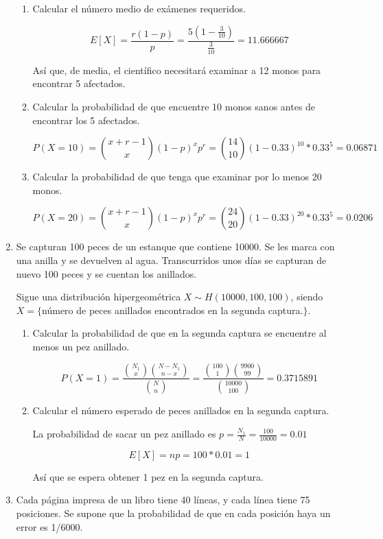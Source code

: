 \documentclass[11pt]{article}
\begin{document}
\begin{enumerate}
\begin{enumerate}
\item Calcular el número medio de exámenes requeridos.

\[
E[X]=\frac{r(1-p)}{p}=\frac{5(1-\frac{3}{10})}{\frac{3}{10}}=11.666667
\]

Así que, de media, el científico necesitará examinar a 12 monos para encontrar 5 afectados.

\item Calcular la probabilidad de que encuentre 10 monos sanos antes de encontrar los 5 afectados.

\[
P(X=10)=\binom{x+r-1}{x}(1-p)^xp^r=\binom{14}{10}(1-0.33)^{10}*0.33^5=0.06871
\]

\item Calcular la probabilidad de que tenga que examinar por lo menos 20 monos.

\[
P(X=20)=\binom{x+r-1}{x}(1-p)^xp^r=\binom{24}{20}(1-0.33)^{20}*0.33^5=0.0206
\]


\end{enumerate}

\item Se capturan 100 peces de un estanque que contiene 10000. Se les marca con una anilla y se devuelven al agua. Transcurridos unos días se capturan de nuevo 100 peces y se cuentan los anillados.

Sigue una distribución hipergeométrica  $X \sim H(10000, 100, 100)$, siendo $X=\{$número de peces anillados encontrados en la segunda captura.$\}$.

\begin{enumerate}

\item Calcular la probabilidad de que en la segunda captura se encuentre al menos un pez anillado.

\[
P(X=1)=\frac{\binom{N_1}{x}\binom{N-N_1}{n-x}}{\binom{N}{n}}=\frac{\binom{100}{1}\binom{9900}{99}}{\binom{10000}{100}}=0.3715891
\]

\item Calcular el número esperado de peces anillados en la segunda captura.

La probabilidad de sacar un pez anillado es $p=\frac{N_1}{N}=\frac{100}{10000}=0.01$

\[
E[X]=np=100*0.01=1
\]

Así que se espera obtener 1 pez en la segunda captura.

\end{enumerate}

\item Cada página impresa de un libro tiene 40 líneas, y cada línea tiene 75 posiciones. Se supone que la probabilidad de que en cada posición haya un error es 1/6000.


\end{enumerate}
\end{document}
